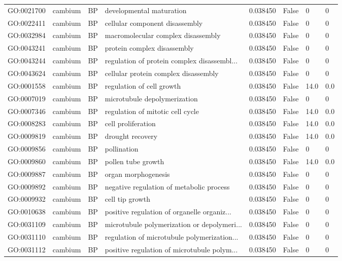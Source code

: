 \begin{longtable}{llllrl}
GO:0021700 & cambium & BP &   developmental maturation  & 0.038450 &   False  & 0 & 0 \\
GO:0022411 & cambium & BP &   cellular component disassembly  & 0.038450 &   False  & 0 & 0 \\
GO:0032984 & cambium & BP &   macromolecular complex disassembly  & 0.038450 &   False  & 0 & 0 \\
GO:0043241 & cambium & BP &   protein complex disassembly  & 0.038450 &   False  & 0 & 0 \\
GO:0043244 & cambium & BP &   regulation of protein complex disassembl...  & 0.038450 &   False  & 0 & 0 \\
GO:0043624 & cambium & BP &   cellular protein complex disassembly  & 0.038450 &   False  & 0 & 0 \\
GO:0001558 & cambium & BP &   regulation of cell growth  & 0.038450 &   False  & 14.0 & 0.0 \\ 
GO:0007019 & cambium & BP &   microtubule depolymerization  & 0.038450 &   False  & 0 & 0 \\
GO:0007346 & cambium & BP &   regulation of mitotic cell cycle  & 0.038450 &   False  & 14.0 & 0.0 \\ 
GO:0008283 & cambium & BP &   cell proliferation  & 0.038450 &   False  & 14.0 & 0.0 \\ 
GO:0009819 & cambium & BP &   drought recovery  & 0.038450 &   False  & 14.0 & 0.0 \\ 
GO:0009856 & cambium & BP &   pollination  & 0.038450 &   False  & 0 & 0 \\
GO:0009860 & cambium & BP &   pollen tube growth  & 0.038450 &   False  & 14.0 & 0.0 \\ 
GO:0009887 & cambium & BP &   organ morphogenesis  & 0.038450 &   False  & 0 & 0 \\
GO:0009892 & cambium & BP &   negative regulation of metabolic process  & 0.038450 &   False  & 0 & 0 \\
GO:0009932 & cambium & BP &   cell tip growth  & 0.038450 &   False  & 0 & 0 \\
GO:0010638 & cambium & BP &   positive regulation of organelle organiz...  & 0.038450 &   False  & 0 & 0 \\
GO:0031109 & cambium & BP &   microtubule polymerization or depolymeri...  & 0.038450 &   False  & 0 & 0 \\
GO:0031110 & cambium & BP &   regulation of microtubule polymerization...  & 0.038450 &   False  & 0 & 0 \\
GO:0031112 & cambium & BP &   positive regulation of microtubule polym...  & 0.038450 &   False  & 0 & 0 \\

\end{longtable}
